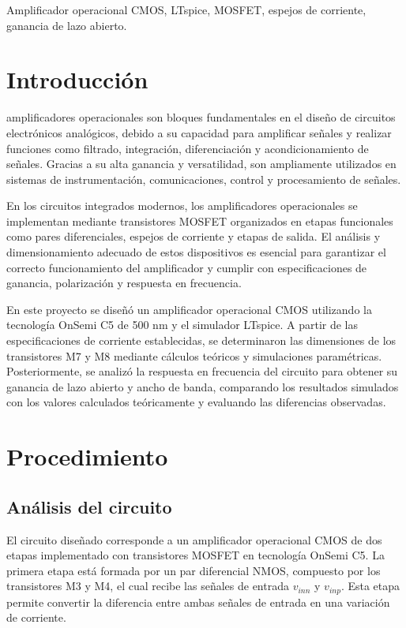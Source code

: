 \documentclass[journal]{IEEEtran}
\begin{document}
\begin{IEEEkeywords}
Amplificador operacional CMOS, LTspice, MOSFET, espejos de corriente, ganancia de lazo abierto.
\end{IEEEkeywords}

\section{Introducción}
 amplificadores operacionales son bloques fundamentales en el diseño de circuitos electrónicos analógicos, debido a su capacidad para amplificar señales y realizar funciones como filtrado, integración, diferenciación y acondicionamiento de señales. Gracias a su alta ganancia y versatilidad, son ampliamente utilizados en sistemas de instrumentación, comunicaciones, control y procesamiento de señales.

En los circuitos integrados modernos, los amplificadores operacionales se implementan mediante transistores MOSFET organizados en etapas funcionales como pares diferenciales, espejos de corriente y etapas de salida. El análisis y dimensionamiento adecuado de estos dispositivos es esencial para garantizar el correcto funcionamiento del amplificador y cumplir con especificaciones de ganancia, polarización y respuesta en frecuencia.

En este proyecto se diseñó un amplificador operacional CMOS utilizando la tecnología OnSemi C5 de 500 nm y el simulador LTspice. A partir de las especificaciones de corriente establecidas, se determinaron las dimensiones de los transistores M7 y M8 mediante cálculos teóricos y simulaciones paramétricas. Posteriormente, se analizó la respuesta en frecuencia del circuito para obtener su ganancia de lazo abierto y ancho de banda, comparando los resultados simulados con los valores calculados teóricamente y evaluando las diferencias observadas.

\section{Procedimiento}
\subsection{Análisis del circuito}
El circuito diseñado corresponde a un amplificador operacional CMOS de dos etapas implementado con transistores MOSFET en tecnología OnSemi C5. La primera etapa está formada por un par diferencial NMOS, compuesto por los transistores M3 y M4, el cual recibe las señales de entrada $v_{inn}$ y $v_{inp}$. Esta etapa permite convertir la diferencia entre ambas señales de entrada en una variación de corriente.
\end{document}
